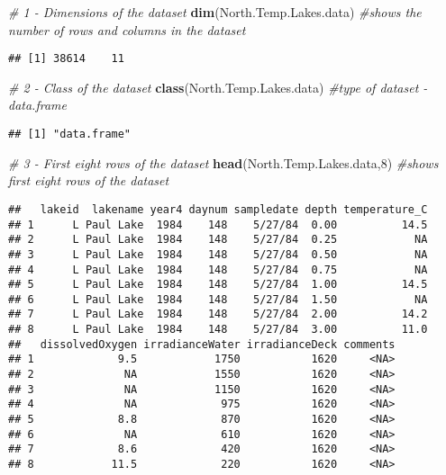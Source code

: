 \documentclass[]{article}
\newenvironment{Shaded}{\begin{snugshade}}{\end{snugshade}}
\newcommand{\KeywordTok}[1]{\textcolor[rgb]{0.13,0.29,0.53}{\textbf{#1}}}
\newcommand{\DecValTok}[1]{\textcolor[rgb]{0.00,0.00,0.81}{#1}}
\newcommand{\CommentTok}[1]{\textcolor[rgb]{0.56,0.35,0.01}{\textit{#1}}}
\newcommand{\NormalTok}[1]{#1}
\begin{document}
\begin{Shaded}
\begin{Highlighting}[]
\CommentTok{# 1 - Dimensions of the dataset}
\KeywordTok{dim}\NormalTok{(North.Temp.Lakes.data) }\CommentTok{#shows the number of rows and columns in the dataset}
\end{Highlighting}
\end{Shaded}

\begin{verbatim}
## [1] 38614    11
\end{verbatim}

\begin{Shaded}
\begin{Highlighting}[]
\CommentTok{# 2 - Class of the dataset}
\KeywordTok{class}\NormalTok{(North.Temp.Lakes.data) }\CommentTok{#type of dataset - data.frame}
\end{Highlighting}
\end{Shaded}

\begin{verbatim}
## [1] "data.frame"
\end{verbatim}

\begin{Shaded}
\begin{Highlighting}[]
\CommentTok{# 3 - First eight rows of the dataset}
\KeywordTok{head}\NormalTok{(North.Temp.Lakes.data,}\DecValTok{8}\NormalTok{) }\CommentTok{#shows first eight rows of the dataset}
\end{Highlighting}
\end{Shaded}

\begin{verbatim}
##   lakeid  lakename year4 daynum sampledate depth temperature_C
## 1      L Paul Lake  1984    148    5/27/84  0.00          14.5
## 2      L Paul Lake  1984    148    5/27/84  0.25            NA
## 3      L Paul Lake  1984    148    5/27/84  0.50            NA
## 4      L Paul Lake  1984    148    5/27/84  0.75            NA
## 5      L Paul Lake  1984    148    5/27/84  1.00          14.5
## 6      L Paul Lake  1984    148    5/27/84  1.50            NA
## 7      L Paul Lake  1984    148    5/27/84  2.00          14.2
## 8      L Paul Lake  1984    148    5/27/84  3.00          11.0
##   dissolvedOxygen irradianceWater irradianceDeck comments
## 1             9.5            1750           1620     <NA>
## 2              NA            1550           1620     <NA>
## 3              NA            1150           1620     <NA>
## 4              NA             975           1620     <NA>
## 5             8.8             870           1620     <NA>
## 6              NA             610           1620     <NA>
## 7             8.6             420           1620     <NA>
## 8            11.5             220           1620     <NA>
\end{verbatim}
\end{document}
